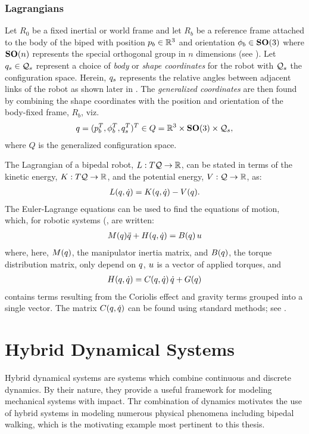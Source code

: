 \subsubsection{Lagrangians}
Let $R_{0}$ be a fixed inertial or world frame and let $R_{b}$ be a reference frame attached to the body of the biped with position $p_{b} \in \mathbb{R}^{3}$ and orientation $\phi_{b} \in \mathbf{SO}(3)$ where $\mathbf{SO}(n)$ represents the special orthogonal group in $n$ dimensions (see \cite{CCNPW86}).
%
Let $q_{s} \in \mathcal{Q}_{s}$ represent a choice of {\em body} or {\em shape coordinates} for the robot with $\mathcal{Q}_{s}$ the configuration space.
%
Herein, $q_{s}$ represents the relative angles between adjacent links of the robot as shown later in .
%
The {\em generalized coordinates} are then found by combining the shape coordinates with the position and orientation of the body-fixed frame, $R_{b}$, viz.
%
\begin{align}
  q = (p_{b}^{T}, \phi_{b}^{T}, q_{s}^{T})^{T} \in Q = \mathbb{R}^{3} \times \mathbf{SO}(3) \times \mathcal{Q}_{s},
\end{align}
%
where $Q$ is the generalized configuration space.

The Lagrangian of a bipedal robot, $L : T\mathcal{Q} \to \mathbb{R}$, can be stated in terms of the kinetic energy, $K : T\mathcal{Q} \to \mathbb{R}$, and the potential energy, $V : \mathcal{Q} \to \mathbb{R}$, as:
%
\begin{align}
  L(q, \dot{q}) = K(q, \dot{q}) - V(q).
\end{align}
%
The Euler-Lagrange equations can be used to find the equations of motion, which, for robotic systems (\cite{MLS94}, are written:
%
\begin{align}
  \label{eqn:eom}
  M(q)\ddot{q} + H(q, \dot{q}) = B(q) \, u
\end{align}
%
where, here, $M(q)$, the manipulator inertia matrix, and $B(q)$, the torque distribution matrix, only depend on $q$, $u$ is a vector of applied torques, and
\begin{align}
  H(q, \dot{q}) = C(q, \dot{q}) \, \dot{q} + G(q)
\end{align}
contains terms resulting from the Coriolis effect and gravity terms grouped into a single vector. The matrix $C(q, \dot{q})$ can be found using standard methods; see \cite{MLS94}.

\section{Hybrid Dynamical Systems}

Hybrid dynamical systems are systems which combine continuous and discrete dynamics.
%
By their nature, they provide a useful framework for modeling mechanical systems with impact.
%
Thr combination of dynamics motivates the use of hybrid systems in modeling numerous physical phenomena including bipedal walking, which is the motivating example most pertinent to this thesis.
%

